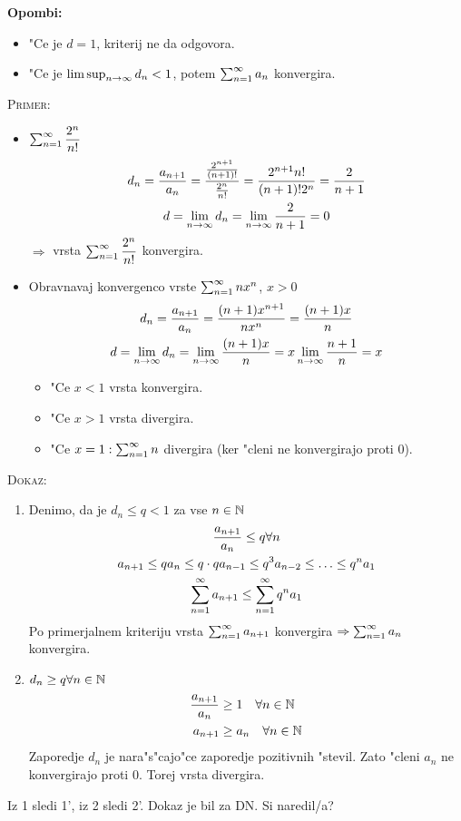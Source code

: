 \textbf{Opombi:}
\begin{itemize}
	\item "Ce je $d = 1$, kriterij ne da odgovora.
	\item "Ce je $\limsup_{n \rightarrow \infty} d_n < 1$, potem $\sum_{n = 1}^{\infty} a_n$ konvergira.
\end{itemize}
\textsc{Primer:}
\begin{itemize}
	\item $\sum_{n = 1}^{\infty}\dfrac{2^n}{n!}$
	\begin{gather*}
	d_n = \dfrac{a_{n+1}}{a_n} = \dfrac{\frac{2^{n+1}}{(n+1)!}}{\frac{2^n}{n!}} = \dfrac{2^{n+1}n!}{(n+1)!2^n} = \dfrac{2}{n+1} \\
	d = \lim_{n \rightarrow \infty} d_n = \lim_{n \rightarrow \infty}\dfrac{2}{n+1} = 0
	\end{gather*}
	$\Rightarrow$ vrsta $\sum_{n = 1}^{\infty}\dfrac{2^n}{n!}$ konvergira.
	
	\item Obravnavaj konvergenco vrste $\sum_{n = 1}^{\infty} nx^n$, $x > 0$
	\begin{gather*}
		d_n = \dfrac{a_{n+1}}{a_n} = \dfrac{(n+1)x^{n+1}}{nx^n} = \dfrac{(n+1)x}{n} \\
		d = \lim_{n \rightarrow \infty} d_n = \lim_{n \rightarrow \infty} \dfrac{(n+1)x}{n} = x \lim_{n \rightarrow \infty} \dfrac{n+1}{n} = x
	\end{gather*}
	\begin{itemize}
		\item "Ce $x < 1$ vrsta konvergira.
		\item "Ce $x > 1$ vrsta divergira.
		\item "Ce $x = 1: \sum_{n = 1}^{\infty}n$ divergira (ker "cleni ne konvergirajo proti 0).
	\end{itemize}
\end{itemize}
\textsc{Dokaz:} 
\begin{enumerate}[1)]
	\item Denimo, da je $d_n \leq q < 1$ za vse $n \in \mathbb{N}$
	\begin{gather*}
	\dfrac{a_{n+1}}{a_n} \leq q \forall n \\
	a_{n+1} \leq q a_n \leq q \cdot q a_{n-1} \leq q^3 a_{n-2} \leq \ldots \leq q^n a_1 \\
	\sum_{n = 1}^{\infty}a_{n+1} \leq \sum_{n = 1}^{\infty}q^n a_1
	\end{gather*}
	Po primerjalnem kriteriju vrsta $\sum_{n = 1}^{\infty}a_{n+1}$ konvergira $\Rightarrow \sum_{n = 1}^{\infty}a_n$ konvergira.
	
	\item $d_n \geq q \forall n \in \mathbb{N}$
	\begin{align*}
	\dfrac{a_{n+1}}{a_n} &\geq 1 \quad \forall n \in \mathbb{N} \\
	a_{n+1} &\geq a_n \quad \forall n \in \mathbb{N}
	\end{align*}
	Zaporedje $d_n$ je nara"s"cajo"ce zaporedje pozitivnih "stevil. Zato "cleni $a_n$ ne konvergirajo proti $0$. Torej vrsta divergira.
\end{enumerate}
Iz 1 sledi 1', iz 2 sledi 2'. Dokaz je bil za DN. Si naredil/a?

